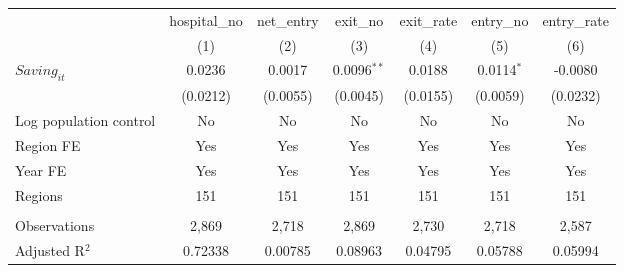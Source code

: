 \begingroup
\centering
\begin{tabular}{lcccccc}
   \toprule
                          & hospital\_no  & net\_entry  & exit\_no      & exit\_rate  & entry\_no    & entry\_rate \\    
                          & (1)           & (2)         & (3)           & (4)         & (5)          & (6)\\  
   \midrule 
   $Saving_{it}$          & 0.0236        & 0.0017      & 0.0096$^{**}$ & 0.0188      & 0.0114$^{*}$ & -0.0080\\   
                          & (0.0212)      & (0.0055)    & (0.0045)      & (0.0155)    & (0.0059)     & (0.0232)\\   
   Log population control & No            & No          & No            & No          & No           & No\\  
   Region FE              & Yes           & Yes         & Yes           & Yes         & Yes          & Yes\\  
   Year FE                & Yes           & Yes         & Yes           & Yes         & Yes          & Yes\\  
   Regions                & 151           & 151         & 151           & 151         & 151          & 151\\  
    \\
   Observations           & 2,869         & 2,718       & 2,869         & 2,730       & 2,718        & 2,587\\  
   Adjusted R$^2$         & 0.72338       & 0.00785     & 0.08963       & 0.04795     & 0.05788      & 0.05994\\  
   \bottomrule
\end{tabular}
\par\endgroup
